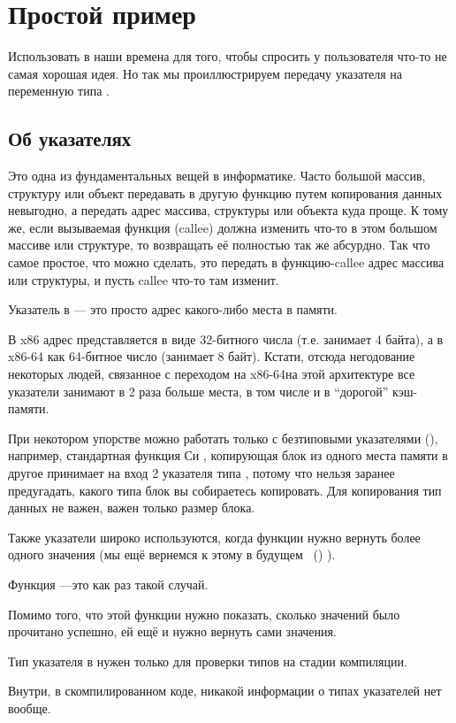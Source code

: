 \section{Простой пример}



Использовать \scanf в наши времена для того, чтобы спросить у пользователя что-то\EMDASH{} 
не самая хорошая идея.
Но так мы проиллюстрируем передачу указателя на переменную типа \Tint.

\subsection{Об указателях}
\myindex{\CLanguageElements!\Pointers}

Это одна из фундаментальных вещей в информатике.
Часто большой массив, структуру или объект передавать в другую функцию путем копирования данных невыгодно, а передать адрес массива, структуры или объекта куда проще.
К тому же, если вызываемая функция (\gls{callee}) должна изменить что-то в этом большом массиве или структуре, то возвращать её полностью так же абсурдно.
Так что самое простое, что можно сделать, это передать в функцию-\gls{callee} адрес массива или структуры, и пусть \gls{callee} что-то там изменит.

Указатель в \CCpp --- это просто адрес какого-либо места в памяти.

В x86 адрес представляется в виде 32-битного числа (т.е. занимает 4 байта), а в x86-64 как 64-битное число (занимает 8 байт).
Кстати, отсюда негодование некоторых людей, связанное с переходом на x86-64\EMDASH{}на этой архитектуре все указатели занимают в 2 раза больше места, в том числе и в ``дорогой'' кэш-памяти.

При некотором упорстве можно работать только с безтиповыми указателями (), например, стандартная функция Си ,
копирующая блок из одного места памяти в другое принимает на вход 2 указателя типа , потому что нельзя заранее предугадать, какого типа блок вы собираетесь копировать.
Для копирования тип данных не важен, важен только размер блока.

Также указатели широко используются, когда функции нужно вернуть более одного значения
(мы ещё вернемся к этому в будущем
~()
).

Функция ---это как раз такой случай.

Помимо того, что этой функции нужно показать, сколько значений было прочитано успешно, ей ещё и нужно вернуть сами значения.

Тип указателя в \CCpp нужен только для проверки типов на стадии компиляции.

Внутри, в скомпилированном коде, никакой информации о типах указателей нет вообще.




\ifdefined\IncludeARM

\fi
\ifdefined\IncludeMIPS

\fi
